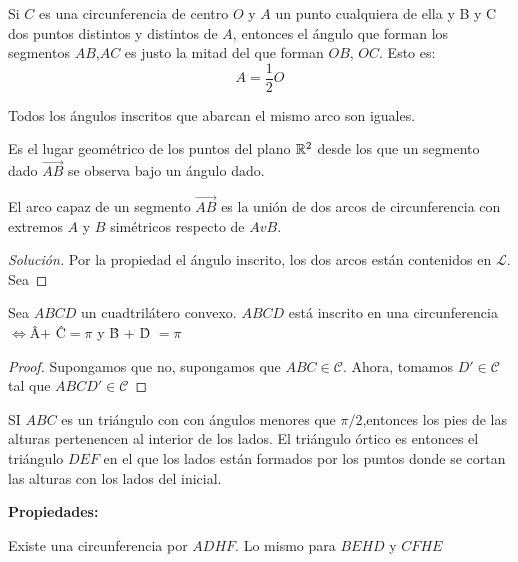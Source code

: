 \begin{nprop}
  Si $C$ es una circunferencia de centro $O$ y $A$ un punto cualquiera de ella y B y C dos puntos distintos y distintos de $A$, entonces el ángulo que forman los segmentos $AB$,$AC$ es justo la mitad del que forman $OB$, $OC$. Esto es:
  \[
    A = \dfrac{1}{2} O
  \]
\end{nprop}
\begin{ncor}
  Todos los ángulos inscritos que abarcan el mismo arco son iguales.
\end{ncor}

\begin{ndef}
	Es el lugar geométrico de los puntos del plano $\mathbb{R}^2$ desde los que un segmento dado $\vec{AB}$ se observa bajo un ángulo dado.
\end{ndef}

\begin{ejemplo}
	El arco capaz de un segmento $\vec{AB}$ es la unión de dos arcos de circunferencia con extremos $A$ y $B$ simétricos respecto de $AvB$.

	\begin{proof}[Solución]
	Por la propiedad el ángulo inscrito, los dos arcos están contenidos en $\mathcal L$. Sea

\end{proof}
\end{ejemplo}
\begin{ejemplo}
	Sea $ABCD$ un cuadtrilátero convexo. $ABCD$ está inscrito en una circunferencia $\iff $\^{A}$ +$ \^{C}$ = \pi$ y \^{B} + \^{D} $ = \pi$
	\begin{proof}
	Supongamos que no, supongamos que $ABC \in \mathcal C$. Ahora, tomamos $D' \in \mathcal C$ tal que $ABCD' \in \mathcal C $
\end{proof}
\end{ejemplo}

\begin{ndef}
	SI $ABC$ es un triángulo con con ángulos menores que $\pi/2$,entonces los pies de las alturas pertenencen al interior de los lados. El triángulo órtico es entonces el triángulo $DEF$ en el que los lados están formados por los puntos donde se cortan las alturas con los lados del inicial.
\end{ndef}

\textbf{Propiedades:}\\
\begin{nlist}
	\item Existe una circunferencia por $ADHF$. Lo mismo para $BEHD$ y $CFHE$
\end{nlist}

